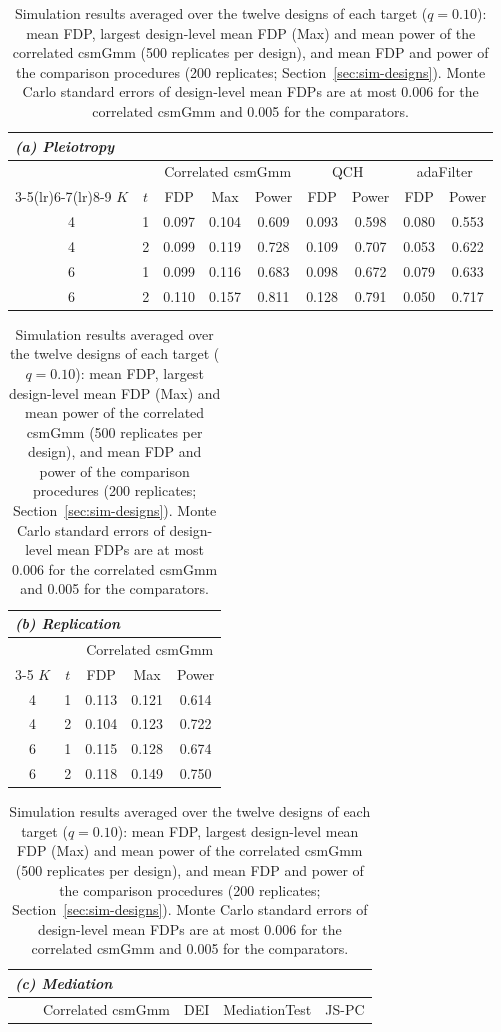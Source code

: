 \begin{table}[!htbp]
\centering
\caption{Simulation results averaged over the twelve designs of each target ($q=0.10$): mean FDP, largest design-level mean FDP (Max) and mean power of the correlated csmGmm (500 replicates per design), and mean FDP and power of the comparison procedures (200 replicates; Section~\ref{sec:sim-designs}). Monte Carlo standard errors of design-level mean FDPs are at most 0.006 for the correlated csmGmm and 0.005 for the comparators.}\label{tab:simulation-overview}
\small
\setlength{\tabcolsep}{4pt}
\begin{tabular}{ccccc cc cc}
\multicolumn{9}{l}{\textit{(a) Pleiotropy}}\\
\toprule
 & & \multicolumn{3}{c}{Correlated csmGmm} & \multicolumn{2}{c}{QCH} & \multicolumn{2}{c}{adaFilter}\\
\cmidrule(lr){3-5}\cmidrule(lr){6-7}\cmidrule(lr){8-9}
$K$ & $t$ & FDP & Max & Power & FDP & Power & FDP & Power\\
\midrule
4 & 1 & 0.097 & 0.104 & 0.609 & 0.093 & 0.598 & 0.080 & 0.553\\
4 & 2 & 0.099 & 0.119 & 0.728 & 0.109 & 0.707 & 0.053 & 0.622\\
6 & 1 & 0.099 & 0.116 & 0.683 & 0.098 & 0.672 & 0.079 & 0.633\\
6 & 2 & 0.110 & 0.157 & 0.811 & 0.128 & 0.791 & 0.050 & 0.717\\
\bottomrule
\end{tabular}
\par\medskip
\begin{tabular}{ccccc}
\multicolumn{5}{l}{\textit{(b) Replication}}\\
\toprule
 & & \multicolumn{3}{c}{Correlated csmGmm}\\
\cmidrule(lr){3-5}
$K$ & $t$ & FDP & Max & Power\\
\midrule
4 & 1 & 0.113 & 0.121 & 0.614\\
4 & 2 & 0.104 & 0.123 & 0.722\\
6 & 1 & 0.115 & 0.128 & 0.674\\
6 & 2 & 0.118 & 0.149 & 0.750\\
\bottomrule
\end{tabular}
\par\medskip
\begin{tabular}{ccccc cc cc cc}
\multicolumn{11}{l}{\textit{(c) Mediation}}\\
\toprule
 & & \multicolumn{3}{c}{Correlated csmGmm} & \multicolumn{2}{c}{DEI} & \multicolumn{2}{c}{MediationTest} & \multicolumn{2}{c}{JS-PC}\\

\end{tabular}
\end{table}
